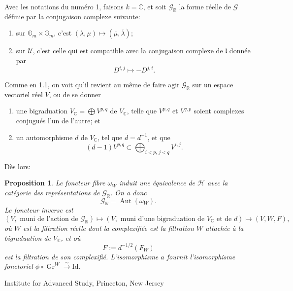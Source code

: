 \documentclass[11pt]{article}
\newtheorem{proposition}{Proposition}[section]
\newcommand{\Gr}{\operatorname{Gr}}
\newcommand{\Aut}{\operatorname{Aut}}
\newcommand{\Gm}{\mathbb G_m}
\begin{document}
Avec les notations du numéro 1, faisons \(k=\mathbb C\), et soit \(\mathcal G_\mathbb R\) la forme réelle de \(\mathcal G\) définie par la conjugaison complexe suivante:
\begin{enumerate}[label=(\alph*)]
\item sur \(\Gm\times\Gm\), c'est \((\lambda,\mu)\mapsto(\overline\mu,\overline\lambda)\);
\item sur \(\mathcal U\), c'est celle qui est compatible avec la conjugaison complexe de \(\mathfrak l\) donnée par
\[
 D^{i,j}\longmapsto -D^{j,i}.
\]
\end{enumerate}
Comme en 1.1, on voit qu'il revient au même de faire agir \(\mathcal G_\mathbb R\) sur un espace vectoriel réel \(V\), ou de se donner
\begin{enumerate}[label=(\alph*)]
\item une bigraduation \(V_\mathbb C=\bigoplus V^{p,q}\) de \(V_\mathbb C\), telle que \(V^{p,q}\) et \(V^{q,p}\) soient complexes conjugués l'un de l'autre; et
\item un automorphisme \(d\) de \(V_\mathbb C\), tel que \(\overline d=d^{-1}\), et que
\[
   (d-1)V^{p,q}\subset\bigoplus_{i<p,\,j<q}V^{i,j}.
\]
\end{enumerate}
Dès lors:

\begin{proposition}
Le foncteur fibre \(\omega_W\) induit une équivalence de \(\mathcal H\) avec la catégorie des représentations de \(\mathcal G_\mathbb R\). On a donc
\[
 \mathcal G_\mathbb R=\Aut(\omega_W).
\]
Le foncteur inverse est
\[
 (V,\text{ muni de l'action de }\mathcal G_\mathbb R)
 \longmapsto
 (V,\text{ muni d'une bigraduation de }V_\mathbb C\text{ et de }d)
 \longmapsto
 (V,W,F),
\]
où \(W\) est la filtration réelle dont la complexifiée est la filtration \(W\) attachée à la bigraduation de \(V_\mathbb C\), et où
\[
 F:=d^{-1/2}(F_W)
\]
est la filtration de son complexifié. L'isomorphisme \(a\) fournit l'isomorphisme fonctoriel \(\phi\circ\Gr^W\xrightarrow{\sim}\mathrm{Id}\).
\end{proposition}

\begin{center}
Institute for Advanced Study, Princeton, New Jersey
\end{center}
\end{document}

